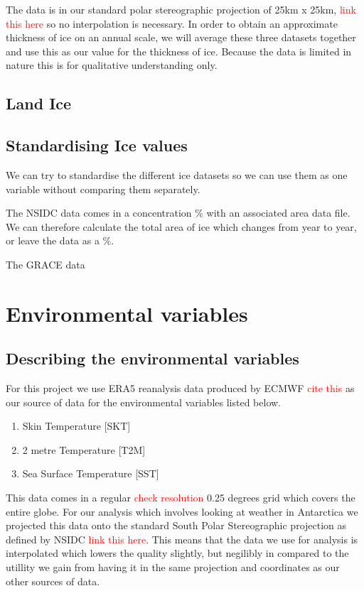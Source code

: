 \documentclass[../main.tex]{subfiles}
\begin{document}
The data is in our standard polar stereographic projection of 25km x 25km, \textcolor{red}{link this here} so no interpolation is necessary. In order to obtain an approximate thickness of ice on an annual scale, we will average these three datasets together and use this as our value for the thickness of ice. Because the data is limited in nature this is for qualitative understanding only.

\subsection*{Land Ice}
\subsection*{Standardising Ice values}

We can try to standardise the different ice datasets so we can use them as one variable without comparing them separately.

The NSIDC data comes in a concentration \% with an associated area data file. We can therefore calculate the total area of ice which changes from year to year, or leave the data as a \%.

The GRACE data



\section{Environmental variables}

\subsection{Describing the environmental variables}

For this project we use ERA5 reanalysis data produced by ECMWF \textcolor{red}{cite this} as our source of data for the environmental variables listed below.

\begin{enumerate}
	\item Skin Temperature [SKT]
	\item 2 metre Temperature [T2M]
	\item Sea Surface Temperature [SST]
\end{enumerate}

This data comes in a regular \textcolor{red}{check resolution} 0.25 degrees grid which covers the entire globe. For our analysis which involves looking at weather in Antarctica we projected this data onto the standard South Polar Stereographic projection as defined by NSIDC \textcolor{red}{link this here}.
This means that the data we use for analysis is interpolated which lowers the quality slightly, but negilibly in compared to the utillity we gain from having it in the same projection and coordinates as our other sources of data.
\end{document}
